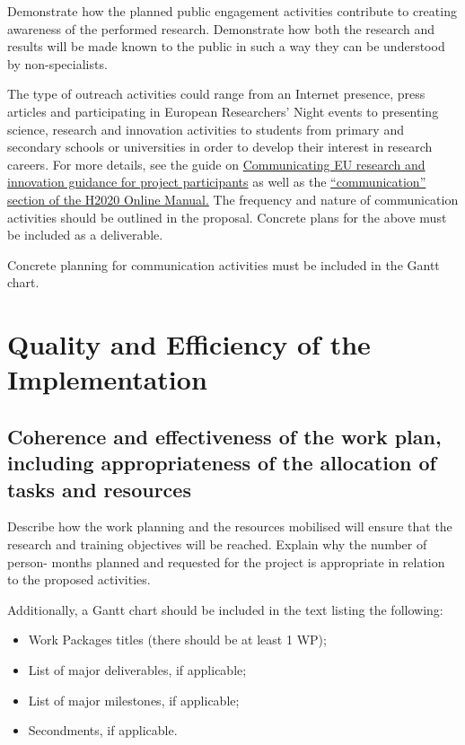 Demonstrate how the planned public engagement activities
contribute to creating awareness of the performed research.
Demonstrate how both the research and results will be made known
to the public in such a way they can be understood by
non-specialists. 

The type of outreach activities could range from an Internet
presence, press articles and participating in European
Researchers' Night events to presenting science, research and
innovation activities to students from primary and secondary
schools or universities in order to develop their interest in
research careers. For more details, see the guide on
\href{http://ec.europa.eu/research/participants/data/ref/h2020/other/gm/h2020-guide-comm_en.pdf}{Communicating
EU research and innovation guidance for project participants} as
well as the
\href{http://ec.europa.eu/research/participants/docs/h2020-funding-guide/grants/grant-management/communication_en.htm}{``communication''
section of the H2020 Online Manual.}
\medskip\noindent
The frequency and nature of communication activities should be
outlined in the proposal. Concrete plans for the above must be
included as a deliverable.

\medskip\noindent
Concrete planning for communication activities must be included in the Gantt chart.

\section{Quality and Efficiency of the Implementation}
  \label{sec:implementation}

\subsection{Coherence and effectiveness of the work plan,
including appropriateness of the allocation of tasks and
resources} 
  \label{sec:implementation_work_plan}

Describe how the work planning and the resources mobilised will
ensure that the research and training objectives will be reached.
Explain why the number of person- months planned and requested for
the project is appropriate in relation to the proposed activities.

Additionally, a Gantt chart should be included in the text listing
the following:
\begin{itemize}
  \item Work Packages titles (there should be at least 1 WP); 
  \item List of major deliverables, if applicable;
  \item List of major milestones, if applicable;
  \item Secondments, if applicable.
\end{itemize}


